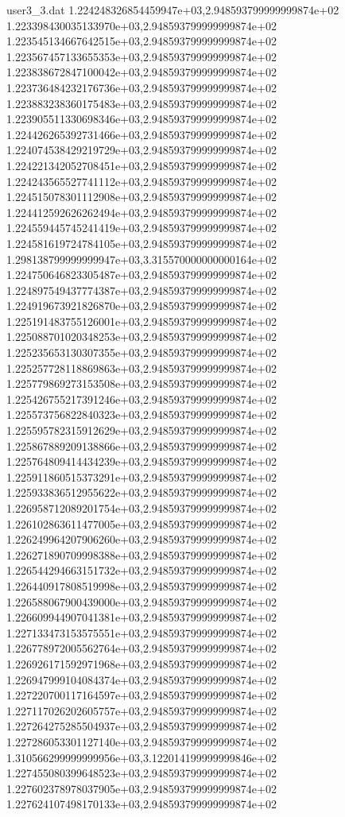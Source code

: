 \begin{filecontents}{user3_3.dat}
1.224248326854459947e+03,2.948593799999999874e+02
1.223398430035133970e+03,2.948593799999999874e+02
1.223545134667642515e+03,2.948593799999999874e+02
1.223567457133655353e+03,2.948593799999999874e+02
1.223838672847100042e+03,2.948593799999999874e+02
1.223736484232176736e+03,2.948593799999999874e+02
1.223883238360175483e+03,2.948593799999999874e+02
1.223905511330698346e+03,2.948593799999999874e+02
1.224426265392731466e+03,2.948593799999999874e+02
1.224074538429219729e+03,2.948593799999999874e+02
1.224221342052708451e+03,2.948593799999999874e+02
1.224243565527741112e+03,2.948593799999999874e+02
1.224515078301112908e+03,2.948593799999999874e+02
1.224412592626262494e+03,2.948593799999999874e+02
1.224559445745241419e+03,2.948593799999999874e+02
1.224581619724784105e+03,2.948593799999999874e+02
1.298138799999999947e+03,3.315570000000000164e+02
1.224750646823305487e+03,2.948593799999999874e+02
1.224897549437774387e+03,2.948593799999999874e+02
1.224919673921826870e+03,2.948593799999999874e+02
1.225191483755126001e+03,2.948593799999999874e+02
1.225088701020348253e+03,2.948593799999999874e+02
1.225235653130307355e+03,2.948593799999999874e+02
1.225257728118869863e+03,2.948593799999999874e+02
1.225779869273153508e+03,2.948593799999999874e+02
1.225426755217391246e+03,2.948593799999999874e+02
1.225573756822840323e+03,2.948593799999999874e+02
1.225595782315912629e+03,2.948593799999999874e+02
1.225867889209138866e+03,2.948593799999999874e+02
1.225764809414434239e+03,2.948593799999999874e+02
1.225911860515373291e+03,2.948593799999999874e+02
1.225933836512955622e+03,2.948593799999999874e+02
1.226958712089201754e+03,2.948593799999999874e+02
1.226102863611477005e+03,2.948593799999999874e+02
1.226249964207906260e+03,2.948593799999999874e+02
1.226271890709998388e+03,2.948593799999999874e+02
1.226544294663151732e+03,2.948593799999999874e+02
1.226440917808519998e+03,2.948593799999999874e+02
1.226588067900439000e+03,2.948593799999999874e+02
1.226609944907041381e+03,2.948593799999999874e+02
1.227133473153575551e+03,2.948593799999999874e+02
1.226778972005562764e+03,2.948593799999999874e+02
1.226926171592971968e+03,2.948593799999999874e+02
1.226947999104084374e+03,2.948593799999999874e+02
1.227220700117164597e+03,2.948593799999999874e+02
1.227117026202605757e+03,2.948593799999999874e+02
1.227264275285504937e+03,2.948593799999999874e+02
1.227286053301127140e+03,2.948593799999999874e+02
1.310566299999999956e+03,3.122014199999999846e+02
1.227455080399648523e+03,2.948593799999999874e+02
1.227602378978037905e+03,2.948593799999999874e+02
1.227624107498170133e+03,2.948593799999999874e+02

\end{filecontents}
